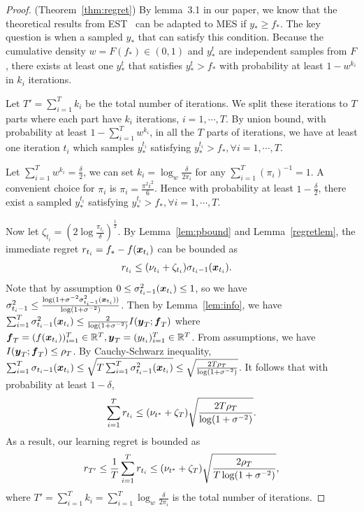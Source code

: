 \begin{proof}(Theorem~\ref{thm:regret})
By lemma~3.1 in our paper, we know that the theoretical results from EST~\cite{wang2016est} can be adapted to MES if $y_* \geq f_*$. The key question is when a sampled $y_*$ that can satisfy this condition. Because the cumulative density $w = F(f_*) \in (0,1)$ and $y^t_*$ are  independent samples from $F$, there exists at least one $y^t_*$ that satisfies $y^t_* > f_*$ with probability at least $1-w^{k_i}$ in $k_i$ iterations. 

Let $T' = \sum_{i=1}^T k_i$ be the total number of iterations. We split these iterations to $T$ parts where each part have $k_i$ iterations, $i = 1,\cdots, T$. By union bound, with probability at least $1-\sum_{i=1}^T w^{k_i}$, in all the $T$ parts of iterations, we have at least one iteration $t_i$ which samples $y^{t_i}_*$ satisfying $y^{t_i}_*>f_*, \forall i = 1,\cdots, T$. 

Let $\sum_{i=1}^T w^{k_i} = \frac{\delta}{2}$, we can set $k_i = \log_w \frac{\delta}{2\pi_i}$ for any $\sum_{i=1}^T(\pi_i)^{-1} = 1$. A convenient choice for $\pi_i$ is $\pi_i= \frac{\pi^2 i^2}{6}$. Hence with probability at least $1-\frac{\delta}{2}$, there exist a sampled $y^{t_i}_*$ satisfying $y^{t_i}_*>f_*, \forall i = 1,\cdots, T$.

Now let $\zeta_{t_i} = (2\log\frac{\pi_{t_i}}{\delta})^{\frac12}$. By Lemma~\ref{lem:pbound} and Lemma~\ref{regretlem}, the immediate regret $r_{t_i} = f_* - f({\boldsymbol{x}}_{t_i})$ can be bounded as
\begin{align*}
r_{t_i} &\leq (\nu_{t_i}  +\zeta_{t_i} )\sigma_{t_i-1}({\boldsymbol{x}}_{t_i}).
\end{align*}
Note that by assumption $0\leq\sigma_{t_i-1}^2({\boldsymbol{x}}_{t_i}) \leq 1$, so we have $\sigma_{t_i-1}^2 \leq \frac{\log(1+\sigma^{-2} \sigma_{t_i-1}^2({\boldsymbol{x}}_{t_i}))}{\log(1+\sigma^{-2})}$.
Then by Lemma~\ref{lem:info}, we have $\sum_{i=1}^T \sigma_{t_i-1}^2({\boldsymbol{x}}_{t_i}) \leq \frac{2}{\log(1+\sigma^{-2})} I(\boldsymbol{y}_T;\boldsymbol{f}_T)$ where $\boldsymbol{f}_T = (f({\boldsymbol{x}}_{t_i}))_{i=1}^T \in \mathbb{R}^T, \boldsymbol{y}_T = (y_{t_i})_{i=1}^T \in \mathbb{R}^T$. From assumptions, we have $I(\boldsymbol{y}_T;\boldsymbol{f}_T)\leq\rho_T $. By Cauchy-Schwarz inequality, $\sum_{i=1}^T \sigma_{t_i-1}({\boldsymbol{x}}_{t_i})\leq \sqrt{T\sum_{i=1}^T \sigma^2_{t_i-1}({\boldsymbol{x}}_{t_i})} \leq \sqrt{\frac{2T \rho_T}{\log(1+\sigma^{-2})}}$. It follows that with probability at least $1-\delta$,
$$\sum_{i=1}^T r_{t_i} \leq  (\nu_{t^*}  +\zeta_{T} ) \sqrt{\frac{2T \rho_T}{\log(1+\sigma^{-2})}}.$$
As a result, our learning regret is bounded as
$$r_{T'}\leq\frac1T\sum_{i=1}^T r_{t_i} \leq  (\nu_{t^*}  +\zeta_{T} ) \sqrt{\frac{2 \rho_T}{T\log(1+\sigma^{-2})}},$$ where $T' = \sum_{i=1}^T k_i = \sum_{i=1}^T \log_{w}\frac{\delta}{2\pi_i}$ is the total number of iterations.
\end{proof}
